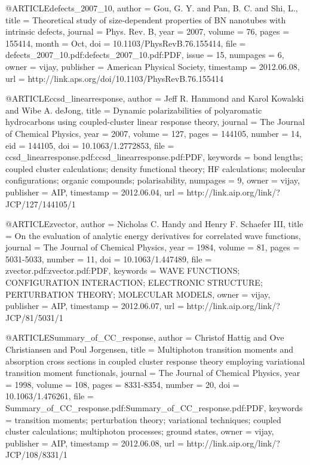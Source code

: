 @ARTICLE{defects_2007_10,
  author = {Gou, G. Y. and Pan, B. C. and Shi, L.},
  title = {Theoretical study of size-dependent properties of BN nanotubes with
	intrinsic defects},
  journal = {Phys. Rev. B},
  year = {2007},
  volume = {76},
  pages = {155414},
  month = {Oct},
  doi = {10.1103/PhysRevB.76.155414},
  file = {defects_2007_10.pdf:defects_2007_10.pdf:PDF},
  issue = {15},
  numpages = {6},
  owner = {vijay},
  publisher = {American Physical Society},
  timestamp = {2012.06.08},
  url = {http://link.aps.org/doi/10.1103/PhysRevB.76.155414}
}

@ARTICLE{ccsd_linearresponse,
  author = {Jeff R. Hammond and Karol Kowalski and Wibe A. deJong},
  title = {Dynamic polarizabilities of polyaromatic hydrocarbons using coupled-cluster
	linear response theory},
  journal = {The Journal of Chemical Physics},
  year = {2007},
  volume = {127},
  pages = {144105},
  number = {14},
  eid = {144105},
  doi = {10.1063/1.2772853},
  file = {ccsd_linearresponse.pdf:ccsd_linearresponse.pdf:PDF},
  keywords = {bond lengths; coupled cluster calculations; density functional theory;
	HF calculations; molecular configurations; organic compounds; polarisability},
  numpages = {9},
  owner = {vijay},
  publisher = {AIP},
  timestamp = {2012.06.04},
  url = {http://link.aip.org/link/?JCP/127/144105/1}
}

@ARTICLE{zvector,
  author = {Nicholas C. Handy and Henry F. Schaefer III},
  title = {On the evaluation of analytic energy derivatives for correlated wave
	functions},
  journal = {The Journal of Chemical Physics},
  year = {1984},
  volume = {81},
  pages = {5031-5033},
  number = {11},
  doi = {10.1063/1.447489},
  file = {zvector.pdf:zvector.pdf:PDF},
  keywords = {WAVE FUNCTIONS; CONFIGURATION INTERACTION; ELECTRONIC STRUCTURE; PERTURBATION
	THEORY; MOLECULAR MODELS},
  owner = {vijay},
  publisher = {AIP},
  timestamp = {2012.06.07},
  url = {http://link.aip.org/link/?JCP/81/5031/1}
}

@ARTICLE{Summary_of_CC_response,
  author = {Christof Hattig and Ove Christiansen and Poul Jorgensen},
  title = {Multiphoton transition moments and absorption cross sections in coupled
	cluster response theory employing variational transition moment functionals},
  journal = {The Journal of Chemical Physics},
  year = {1998},
  volume = {108},
  pages = {8331-8354},
  number = {20},
  doi = {10.1063/1.476261},
  file = {Summary_of_CC_response.pdf:Summary_of_CC_response.pdf:PDF},
  keywords = {transition moments; perturbation theory; variational techniques; coupled
	cluster calculations; multiphoton processes; ground states},
  owner = {vijay},
  publisher = {AIP},
  timestamp = {2012.06.08},
  url = {http://link.aip.org/link/?JCP/108/8331/1}
}

